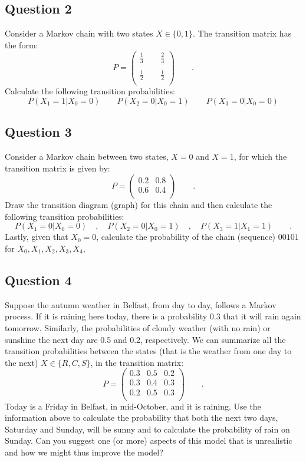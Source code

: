 \documentclass[a4paper]{article}
\begin{document}
\subsection{Question 2}

Consider a Markov chain with two states $X  \in  \{0, 1\}$. The  transition matrix has the form:
$$
P=
\left(
\begin{matrix}
\frac{1}{3}  &  \ \ & \frac{2}{3} \\
             &  & \\
\frac{1}{2}  & \ \ &  \frac{1}{2} \\
\end{matrix}
\right) \qquad .
$$
Calculate the following transition probabilities:
$$
P (X_1 = 1  |X_0 = 0) \qquad P (X_2 = 0|X_0 = 1) \qquad P (X_3 = 0 |X_0 = 0)
$$

\subsection{Question 3}

Consider a Markov chain between two states, $X=0$ and $X=1$,  for which
the transition matrix is given by:
$$
P=
\left(
\begin{matrix}
0.2 & 0.8 \\
0.6 & 0.4 \\
\end{matrix}
\right) \qquad .
$$
Draw the transition diagram (graph) for this chain and then calculate the following
transition probabilities:
$$
P(X_{1}=0 \vert X_{0}=0) \quad , \quad
P(X_{2}=0 \vert X_{0}=1) \quad , \quad
P(X_{3}=1 \vert X_{1}=1) \qquad .
$$
Lastly, given that $X_{0}=0$, calculate the probability of the chain (sequence) $00101$ for $X_0,X_{1},X_{2},X_{3},X_{4}$,

\subsection{Question 4}

Suppose the autumn weather in Belfast, from day to day, follows a Markov
process. If it is raining here today, there is a probability 0.3 that it
will rain again tomorrow. Similarly, the probabilities of cloudy  weather
(with no rain) or sunshine the next day are 0.5 and 0.2, respectively.
We can summarize all the transition probabilities between the states (that
is the weather from one day to the next)
$X \in \{ R,C,S \}$, in the transition matrix:
$$
P= \left(
\begin{matrix}
0.3  &   0.5  &  0.2 \\
0.3  &   0.4  &  0.3 \\
0.2  &   0.5  &  0.3 \\
\end{matrix}
\right)
\qquad .
$$
Today is a Friday in Belfast,   in  mid-October,  and it is raining.   Use the information above
to calculate the probability that both the next two days, Saturday and Sunday, will be sunny and to calculate
the probability of rain on Sunday.  Can you suggest one (or more) aspects of this model that is
unrealistic and how we might thus improve the model?
\end{document}
